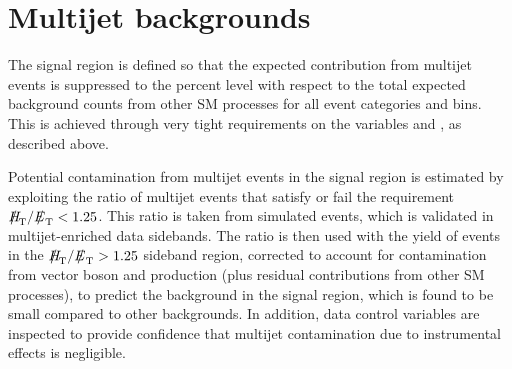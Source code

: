 \section{Multijet backgrounds}
\label{sec:qcd_background}

The signal region is defined so that the expected contribution from
multijet events is suppressed to the percent level with respect to
the total expected background counts from other SM processes for all
event categories and \scalht bins. This is achieved through very tight
requirements on the variables \alphat and \dphi, as described
above. 

Potential contamination from multijet events in the signal region is
estimated by exploiting the ratio of multijet events that satisfy or
fail the requirement $\mhtmet < 1.25$. This ratio is taken from
simulated events, which is validated in multijet-enriched data
sidebands. The ratio is then used with the yield of events in the
$\mhtmet > 1.25$ sideband region, corrected to account for
contamination from vector boson and \ttbar production (plus residual
contributions from other SM processes), to predict the background in
the signal region, which is found to be small compared to other
backgrounds. In addition, data control variables are inspected to
provide confidence that multijet contamination due to instrumental
effects is negligible.

